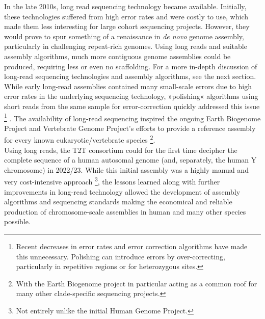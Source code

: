 

In the late 2010s, long read sequencing technology became available.
Initially, these technologies suffered from high error rates and were costly to use\cite{wang21, mahmoud25}, which made them less interesting for large cohort sequencing projects.
However, they would prove to spur something of a renaissance in \textit{de novo} genome assembly, particularly in challenging repeat-rich genomes\cite{logsdon20, mahmoud25}.
Using long reads and suitable assembly algorithms, much more contiguous genome assemblies could be produced, requiring less or even no scaffolding\cite{mahmoud25}. %
For a more in-depth discussion of long-read sequencing technologies and assembly algorithms, see the next section.
While early long-read assemblies contained many small-scale errors due to high error rates in the underlying sequencing technology, »polishing« algorithms using short reads from the same sample for error-correction quickly addressed this issue
\footnote{Recent decreases in error rates and error correction algorithms have made this unnecessary. Polishing can introduce errors by over-correcting, particularly in repetitive regions or for heterozygous sites.}%
\cite{hu24, mastoras24}.
The availability of long-read sequencing inspired the ongoing Earth Biogenome Project and Vertebrate Genome Project's efforts to provide a reference assembly for every known eukaryotic/vertebrate species
\footnote{With the Earth Biogenome project in particular acting as a common roof for many other clade-specific sequencing projects.}\cite{lewin18, rhie21}.\\
Using long reads, the T2T consortium could for the first time decipher the complete sequence of a human autosomal genome (and, separately, the human Y chromosome) in 2022/23\cite{nurk22, rhie23}. %
While this initial assembly was a highly manual and very cost-intensive approach \footnote{Not entirely unlike the initial Human Genome Project.}, the lessons learned along with further improvements in long-read technology allowed the development of assembly algorithms and sequencing standards making the economical and reliable production of chromosome-scale assemblies in human and many other species possible.

